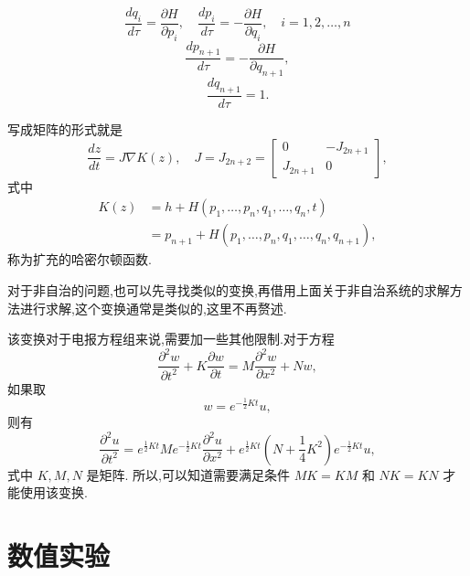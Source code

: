 \begin{equation*}
	\frac{dq_i}{d\tau}=\frac{\partial H}{\partial p_i},\quad \frac{dp_i}{d\tau}=-\frac{\partial H}{\partial q_i},\quad i=1,2,\ldots,n
\end{equation*}
\begin{equation*}
	\frac{dp_{n+1}}{d\tau} = -\frac{\partial H}{\partial q_{n+1}},
\end{equation*}
\begin{equation*}
	\frac{dq_{n+1}}{d\tau} =1.
\end{equation*}

写成矩阵的形式就是
\begin{equation*}
	\frac{dz}{dt}=J\nabla K(z),\quad J=J_{2n+2}=\begin{bmatrix}
	0&-J_{2n+1}\\
	J_{2n+1}&0
	\end{bmatrix},
\end{equation*}
式中
\begin{equation*}
	\begin{aligned}
		K(z)&=h+H(p_1,\ldots,p_n,q_1,\ldots,q_n,t)\\
		&=p_{n+1}+H(p_1,\ldots,p_n,q_1,\ldots,q_n,q_{n+1}),
	\end{aligned}
\end{equation*}
称为扩充的哈密尔顿函数.

对于非自治的问题,也可以先寻找类似的变换,再借用上面关于非自治系统的求解方法进行求解,这个变换通常是类似的,这里不再赘述.

该变换对于电报方程组来说,需要加一些其他限制.对于方程
\begin{equation*}
\frac{\partial ^2 w}{\partial t^2}+K\frac{\partial w}{\partial t}=M \frac{\partial ^2 w}{\partial x^2} + N w,
\end{equation*}
如果取
\begin{equation*}
w=e^{-\frac{1}{2}Kt}u,
\end{equation*}
则有
\begin{equation*}
\frac{\partial ^2 u}{\partial t^2}= e^{\frac{1}{2}Kt} M e^{-\frac{1}{2}Kt}\frac{\partial ^2 u}{\partial x^2} +
e^{\frac{1}{2}Kt}(N+\frac{1}{4}K^2)e^{-\frac{1}{2}Kt} u,
\end{equation*}
式中 $K,M,N$ 是矩阵. 所以,可以知道需要满足条件 $MK=KM$ 和 $NK=KN$ 才能使用该变换.

\section{数值实验}\label{sec:02numerical}

